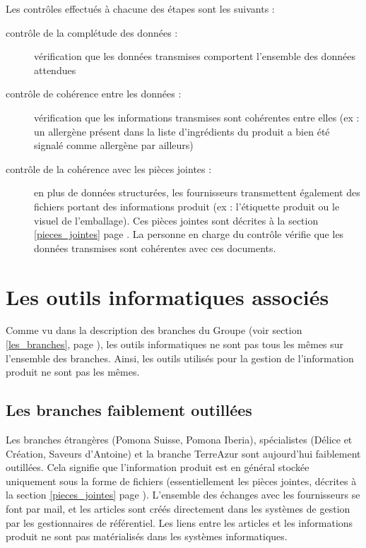             Les contrôles effectués à chacune des étapes sont les suivants : 
            \begin{description}
                \item[contrôle de la complétude des données :] vérification que les données transmises comportent l'ensemble des données attendues
                \item[contrôle de cohérence entre les données :] vérification que les informations transmises sont cohérentes entre elles (ex : un allergène présent dans la liste d'ingrédients du produit a bien été signalé comme allergène par ailleurs)
                \item[contrôle de la cohérence avec les pièces jointes :] en plus de données structurées, les fournisseurs transmettent également des fichiers portant des informations produit (ex : l'étiquette produit ou le visuel de l'emballage). Ces pièces jointes sont décrites à la section \ref{pieces_jointes} page \pageref{pieces_jointes}. La personne en charge du contrôle vérifie que les données transmises sont cohérentes avec ces documents.
            \end{description}

        \section{Les outils informatiques associés}

        Comme vu dans la description des branches du Groupe (voir section \ref{les_branches}, page \pageref{les_branches}), les outils informatiques ne sont pas tous les mêmes sur l'ensemble des branches.
        Ainsi, les outils utilisés pour la gestion de l'information produit ne sont pas les mêmes.

            \subsection{Les branches faiblement outillées}
            
            Les branches étrangères (Pomona Suisse, Pomona Iberia), spécialistes (Délice et Création, Saveurs d'Antoine) et la branche TerreAzur sont aujourd'hui faiblement outillées.
            Cela signifie que l'information produit est en général stockée uniquement sous la forme de fichiers (essentiellement les pièces jointes, décrites à la section \ref{pieces_jointes} page \pageref{pieces_jointes}).
            L'ensemble des échanges avec les fournisseurs se font par mail, et les articles sont créés directement dans les systèmes de gestion par les gestionnaires de référentiel.
            Les liens entre les articles et les informations produit ne sont pas matérialisés dans les systèmes informatiques.

